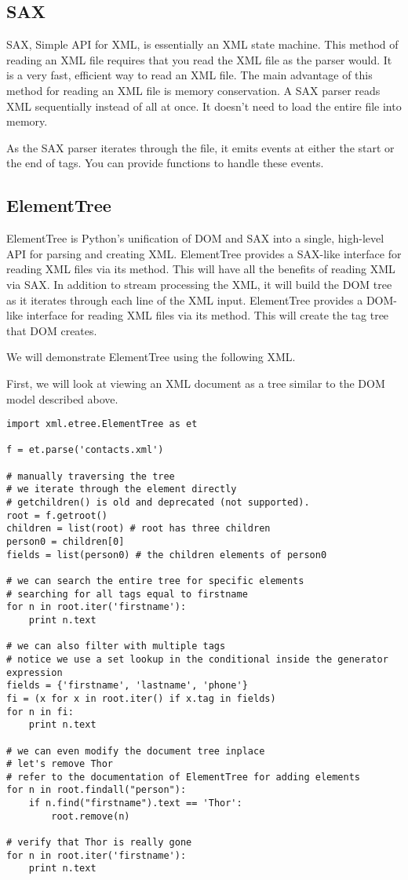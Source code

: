 \subsection*{SAX}
SAX, Simple API for XML, is essentially an XML state machine.
This method of reading an XML file requires that you read the XML file as the parser would.
It is a very fast, efficient way to read an XML file.
The main advantage of this method for reading an XML file is memory conservation.
A SAX parser reads XML sequentially instead of all at once.
It doesn't need to load the entire file into memory.

As the SAX parser iterates through the file, it emits events at either the start or the end of tags.
You can provide functions to handle these events.


\subsection*{ElementTree}
ElementTree is Python's unification of DOM and SAX into a single, high-level API for parsing and creating XML.
ElementTree provides a SAX-like interface for reading XML files via its  method.
This will have all the benefits of reading XML via SAX.
In addition to stream processing the XML, it will build the DOM tree as it iterates through each line of the XML input.
ElementTree provides a DOM-like interface for reading XML files via its  method.
This will create the tag tree that DOM creates.

We will demonstrate ElementTree using the following XML.


First, we will look at viewing an XML document as a tree similar to the DOM model described above.
\begin{lstlisting}
import xml.etree.ElementTree as et

f = et.parse('contacts.xml')

# manually traversing the tree
# we iterate through the element directly
# getchildren() is old and deprecated (not supported).
root = f.getroot()
children = list(root) # root has three children
person0 = children[0]
fields = list(person0) # the children elements of person0

# we can search the entire tree for specific elements
# searching for all tags equal to firstname
for n in root.iter('firstname'):
    print n.text
    
# we can also filter with multiple tags 
# notice we use a set lookup in the conditional inside the generator expression
fields = {'firstname', 'lastname', 'phone'}
fi = (x for x in root.iter() if x.tag in fields)
for n in fi:
    print n.text
    
# we can even modify the document tree inplace
# let's remove Thor
# refer to the documentation of ElementTree for adding elements
for n in root.findall("person"):
    if n.find("firstname").text == 'Thor':
        root.remove(n)

# verify that Thor is really gone
for n in root.iter('firstname'):
    print n.text
\end{lstlisting}

